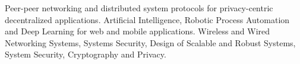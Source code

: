 

\begin{resume}
 
Peer-peer networking and distributed system protocols for privacy-centric decentralized applications.
Artificial Intelligence, Robotic Process Automation and Deep Learning for web and mobile applications.
Wireless and Wired Networking Systems, Systems Security, Design of Scalable and Robust
Systems, System Security, Cryptography and Privacy.


\end{resume}
